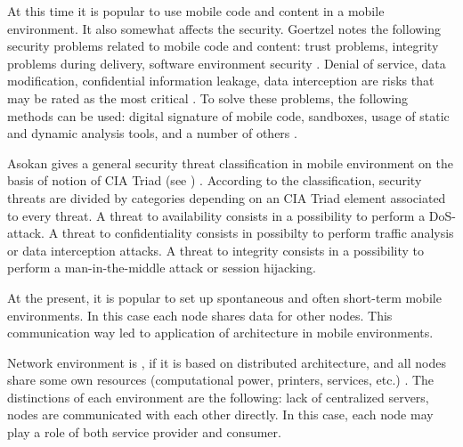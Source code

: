 %
At this time it is popular to use mobile code and content in a mobile environment. 
%
It also somewhat affects the security. 
%
Goertzel notes the following security problems related to mobile code and content: trust problems, integrity problems during delivery, software environment security . 
%
Denial of service, data modification, confidential information leakage, data interception are risks that may be rated as the most critical . 
%
To solve these problems, the following methods can be used: digital signature of mobile code, sandboxes, usage of static and dynamic analysis tools, and a number of others    . 

%
Asokan gives a general security threat classification in mobile environment on the basis of notion of CIA Triad (see ) . 
%
According to the classification, security threats are divided by categories depending on an CIA Triad element associated to every threat. 
%
A threat to availability consists in a possibility to perform a DoS-attack. 
%
A threat to confidentiality consists in possibilty to perform traffic analysis or data interception attacks. 
%
A threat to integrity consists in a possibility to perform a man-in-the-middle attack or session hijacking. 

%
At the present, it is popular to set up spontaneous and often short-term mobile environments. 
%
In this case each node shares data for other nodes. 
%
This communication way led to application of  architecture in mobile environments. 



%
Network environment is , if it is based on distributed architecture, and all nodes share some own resources (computational power, printers, services, etc.) . 
%
The distinctions of each  environment are the following: lack of centralized servers, nodes are communicated with each other directly. 
%
In this case, each node may play a role of both service provider and consumer. 

